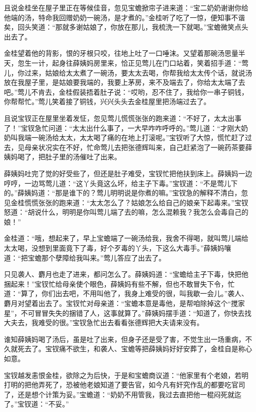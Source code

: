 \documentclass[12pt,oneside]{book}
\begin{document}
且说金桂坐在屋子里正在等候佳音，忽见宝蟾掀帘子进来道：“宝二奶奶谢谢你给他端的汤，特命我回赠奶奶一碗汤，是才煮的。”金桂听了吃了一惊，便知事不谐矣，回头笑道：“那就多谢姑娘了，你放在那儿，我梳洗一下就喝。”宝蟾微笑点头出去了。

金桂望着他的背影，恨的牙根只咬，往地上吐了一口唾沫。又望着那碗汤思量半天，忽生一计，起身往薛姨妈房里来，恰正见莺儿在门口站着，笑着招手道：“莺儿，你过来，姑娘给太太煮了一碗汤，要太太去喝，你帮我给太太传个话，就说汤放在我屋子里，是姑娘要我端的，我要上茅房，来不及端去了，你给太太端了去吧。”莺儿不肯去，金桂假装捂着肚子说：“哎哟，忍不住了，我给你一串子铜钱，你帮帮忙。”莺儿笑着接了铜钱，兴兴头头去金桂屋里把汤端过去了。

且说宝钗正在屋里坐着发怔，忽见莺儿慌慌张张的跑来道：“不好了，太太出事了！”宝钗急忙问道：“太太出什么事了，一大早咋咋呼呼的。”莺儿道：“才刚大奶奶叫我端一碗汤给太太，太太喝了痛的在地上打滚呢。”宝钗听了大惊，慌忙赶了过去，见母亲状况实在不好，忙命莺儿去把张德辉叫来，自己赶紧泡了一碗药茶要薛姨妈喝了，把肚子里的汤催吐了出来。

薛姨妈吐完了觉的好受些了，但还是肚子难受，宝钗忙把他扶到床上。薛姨妈一边哼哼，一边骂莺儿道：“这丫头竟这么坏，给主子下毒。”宝钗道：“不是莺儿下的。”薛姨妈道：“那是谁下的？莺儿明明说是你煮的嘛。”宝钗急的解释不清白，忽见金桂慌慌张张的跑来道：“太太怎么了？姑娘怎么给自己的娘亲下起毒来。”宝钗怒道：“胡说什么，明明是你叫莺儿端了去的嘛，怎么混赖我？我怎么会毒自己的娘！”

金桂道：“哦，想起来了，早上宝蟾端了一碗汤给我，我舍不得喝，就叫莺儿端给太太喝，没想到里面竟下了毒，好个歹毒的丫头，下这么大毒手。”薛姨妈嚷道：“把宝蟾那个孽障给我叫来。”莺儿答应了出去了。

只见袭人、麝月也走了进来，都问怎么了。薛姨妈道：“宝蟾给主子下毒，快把他捆起来！”宝钗忙给母亲使个眼色，薛姨妈有些不解，但也不敢冒失下令，忙道：“算了，你们出去吧，不用叫他了，我身上难受的很，叫我歇一会儿。”袭人、麝月对望着出去了。宝钗忙对母亲道：“宝蟾本意是毒他，是帮咱除掉这个“搅家星”，不可冒冒失失的捆错了人，这事就算了。”薛姨妈摆手道：“知道了，你快去找大夫去，我难受的很。”宝钗急忙出去看看张德辉把大夫请来没有。

谁知薛姨妈喝了汤后，虽是吐了出来，但身子还是受了害，不觉生出一场重病，不久就死去了。宝钗痛不欲生，和袭人、宝蟾等把薛姨妈好好安葬了，金桂自是称心如意。

宝钗越发恚恨金桂，欲除之为后快，于是和宝蟾商议道：“他家里有个老娘，若明打明的把他弄死了，恐被他老娘知道了要告官，如今凡有奸究作乱的都要吃官司了，还是想个计策为妥。”宝蟾道：“奶奶不用管我，我过去直把他一棍闷死就迄了。”宝钗道：“不妥。”
\end{document}
